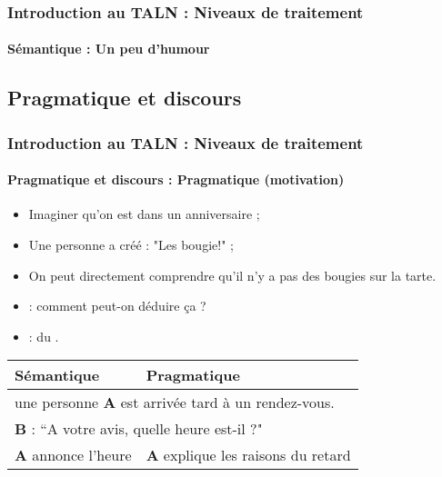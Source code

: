 \documentclass[xcolor=table]{beamer}
\begin{document}
\begin{frame}
\frametitle{Introduction au TALN : Niveaux de traitement}
\framesubtitle{Sémantique : Un peu d'humour}

\begin{center}
\end{center}

\end{frame}

\subsection{Pragmatique et discours}

\begin{frame}
\frametitle{Introduction au TALN : Niveaux de traitement}
\framesubtitle{Pragmatique et discours : Pragmatique (motivation)}

\begin{minipage}{0.7\textwidth}
\begin{itemize}
	\item Imaginer qu'on est dans un anniversaire ;
	\item Une personne a créé : "Les bougie!" ;
	\item On peut directement comprendre qu'il n'y a pas des bougies sur la tarte.
	\item {} : comment peut-on déduire ça ? 
	\item {} : du .
\end{itemize}
\end{minipage}
\begin{minipage}{0.28\textwidth}
\end{minipage}

\vfill
\begin{tabular}{|p{}|p{}|}
	\hline
	\bfseries Sémantique & \bfseries Pragmatique \\
	\hline 
	\multicolumn{2}{|l|}{une personne \textbf{A} est arrivée tard à un rendez-vous.} \\
	\multicolumn{2}{|l|}{\textbf{B} : ``A votre avis, quelle heure est-il ?"} \\
	\hline 
	\textbf{A} annonce l'heure &  \textbf{A} explique les raisons du retard \\
	\hline
\end{tabular}

\end{frame}
\end{document}
